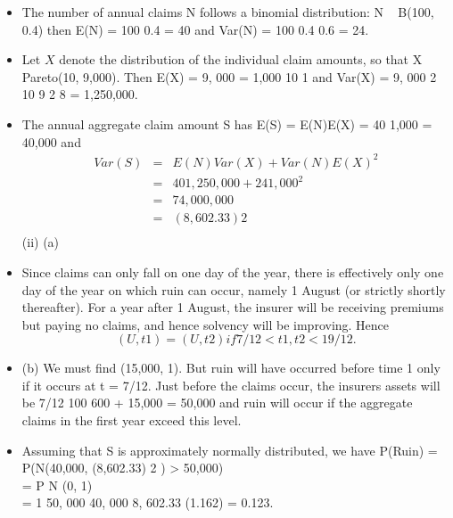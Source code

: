 \documentclass[a4paper,12pt]{article}
\begin{document}
\begin{itemize}
\item The number of annual claims N follows a binomial distribution:
N ~ B(100, 0.4) then
E(N) = 100
0.4 = 40
and
Var(N) = 100
0.4
0.6 = 24.
\item Let $X$ denote the distribution of the individual claim amounts, so that X ~
Pareto(10, 9,000). Then
E(X) =
9, 000
= 1,000
10 1
and
Var(X) =
9, 000 2 10
9 2 8
= 1,250,000.
\item The annual aggregate claim amount S has
E(S) = E(N)E(X) = 40
1,000 = 40,000
and
\begin{eqnarray*}
Var(S) &=& E(N)Var(X) + Var(N)E(X)^2\\
&=& 40
1,250,000 + 24
1,000^2\\
&=& 74,000,000\\
&=& (8,602.33) 2\\
\end{eqnarray*}
(ii)
(a)
\item Since claims can only fall on one day of the year, there is effectively only one day of the year on which ruin can occur, namely 1 August (or strictly shortly thereafter). For a year after 1 August, the insurer will be receiving premiums but paying no claims, and hence solvency will be improving. Hence
\[(U, t 1 ) = (U, t 2 ) if 7/12 < t 1 , t 2 < 19/12.\]
\item (b)
We must find (15,000, 1). But ruin will have occurred before time 1
only if it occurs at t = 7/12. Just before the claims occur, the insurers assets will be 7/12 100 600 + 15,000 = 50,000 and ruin will occur if the aggregate claims in the first year exceed this level. \item Assuming that S is approximately normally distributed, we have
P(Ruin) = P(N(40,000, (8,602.33) 2 ) > 50,000)\\
= P N (0, 1)\\
= 1
50, 000 40, 000
8, 602.33
(1.162)
= 0.123.
\end{itemize}
\end{document}
